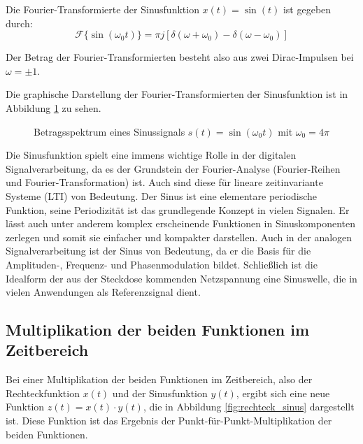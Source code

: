 Die Fourier-Transformierte der Sinusfunktion $x(t) = \sin(t)$ ist gegeben durch:
\[
\mathcal{F}\{\sin(\omega_0 t)\} = \pi j \left[ \delta(\omega + \omega_0) - \delta(\omega - \omega_0) \right]
\]

Der Betrag der Fourier-Transformierten besteht also aus zwei Dirac-Impulsen bei $\omega = \pm 1$.

Die graphische Darstellung der Fourier-Transformierten der Sinusfunktion ist in Abbildung \ref{fig:fourier_sinus_komplex} zu sehen.
\begin{figure}[H]
\centering
{}
\caption{Betragsspektrum eines Sinussignals $s(t) = \sin(\omega_0 t)$ mit $\omega_0 = 4\pi$}
\label{fig:fourier_sinus_komplex}
\end{figure}

Die Sinusfunktion spielt eine immens wichtige Rolle in der digitalen Signalverarbeitung, da es der Grundstein der Fourier-Analyse (Fourier-Reihen und Fourier-Transformation) ist. Auch sind diese für lineare zeitinvariante Systeme (LTI) von Bedeutung. 
Der Sinus ist eine elementare periodische Funktion, seine Periodizität ist das grundlegende Konzept in vielen Signalen. Er lässt auch unter anderem komplex erscheinende Funktionen in Sinuskomponenten zerlegen und somit sie einfacher und kompakter darstellen.
Auch in der analogen Signalverarbeitung ist der Sinus von Bedeutung, da er die Basis für die Amplituden-, Frequenz- und Phasenmodulation bildet. Schließlich ist die Idealform der aus der Steckdose kommenden Netzspannung eine Sinuswelle, die in vielen Anwendungen als Referenzsignal dient. 

\subsection{Multiplikation der beiden Funktionen im Zeitbereich}
Bei einer Multiplikation der beiden Funktionen im Zeitbereich, also der Rechteckfunktion $x(t)$ und der Sinusfunktion $y(t)$, ergibt sich eine neue Funktion $z(t) =  x(t) \cdot y(t)$, die in Abbildung \ref{fig:rechteck_sinus} dargestellt ist. Diese Funktion ist das Ergebnis der Punkt-für-Punkt-Multiplikation der beiden Funktionen.

